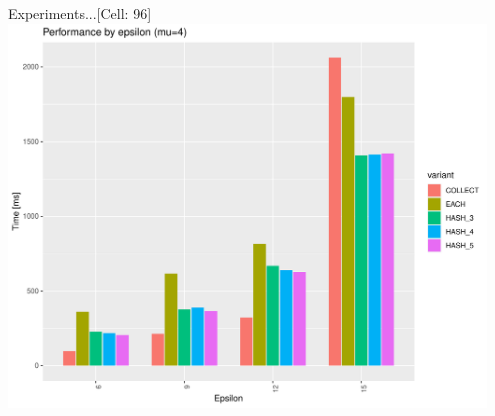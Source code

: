 \documentclass{beamer}
\begin{document}
\begin{frame}{Experiments...}{[Cell: 96]}
    \centering
    \includegraphics[width=0.95\textwidth]{figures/C_96E_15_M4} 
\end{frame}
\end{document}
